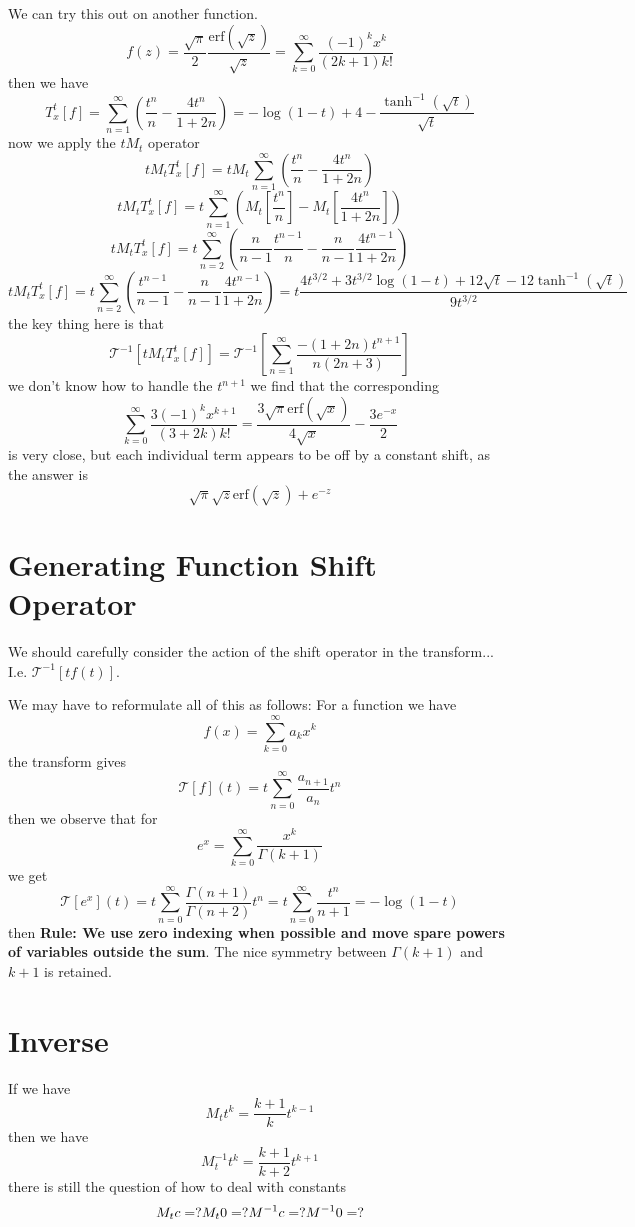 \documentclass{article}
\begin{document}
We can try this out on another function.
$$
f(z) = \frac{\sqrt{\pi}}{2}\frac{\mathrm{erf}(\sqrt{z})}{\sqrt{z}} = \sum_{k=0}^\infty \frac{(-1)^k x^k}{(2k+1)k!}
$$
then we have 
$$
T_x^t[f] = \sum_{n=1}^\infty \left(\frac{t^n}{n} - \frac{4 t^n}{1+2n}\right) = - \log(1-t) + 4 - \frac{\tanh^{-1}(\sqrt{t})}{\sqrt{t}}
$$
now we apply the $t M_t$ operator
$$
t M_t T_x^t[f] = t M_t \sum_{n=1}^\infty \left(\frac{t^n}{n} - \frac{4 t^n}{1+2n}\right)
$$
$$
t M_t T_x^t[f] =  t\sum_{n=1}^\infty \left( M_t[\frac{t^n}{n}] - M_t[\frac{4 t^n}{1+2n}]\right)
$$
$$
t M_t T_x^t[f] =  t \sum_{n=2}^\infty \left( \frac{n}{n-1}\frac{t^{n-1}}{n} - \frac{n}{n-1}\frac{4 t^{n-1}}{1+2n}\right)
$$
$$
t M_t T_x^t[f] =  t \sum_{n=2}^\infty \left( \frac{t^{n-1}}{n-1} - \frac{n}{n-1}\frac{4 t^{n-1}}{1+2n}\right) = t \frac{4 t^{3/2}+3 t^{3/2} \log (1-t)+12 \sqrt{t}-12
    \tanh ^{-1}\left(\sqrt{t}\right)}{9 t^{3/2}}
$$
the key thing here is that
$$
\mathcal{T}^{-1}[t M_t T_x^t[f]] = \mathcal{T}^{-1}[\sum_{n=1}^\infty \frac{-(1+2n)t^{n+1}}{n(2n+3)}]
$$
we don't know how to handle the $t^{n+1}$ we find that the corresponding 
$$
\sum_{k=0}^\infty \frac{3 (-1)^k x^{k+1}}{(3+2k)k!} =   \frac{3 \sqrt{\pi } \text{erf}\left(\sqrt{x}\right)}{4 \sqrt{x}}-\frac{3
    e^{-x}}{2}
$$
is very close, but each individual term appears to be off by a constant shift, as the answer is 
$$
\sqrt{\pi } \sqrt{z} \text{erf}\left(\sqrt{z}\right)+e^{-z}
$$

\section{Generating Function Shift Operator}
We should carefully consider the action of the shift operator in the transform... I.e. $\mathcal{T}^{-1}[t f(t)]$.

We may have to reformulate all of this as follows:
For a function we have 
$$
f(x) = \sum_{k=0}^\infty a_k x^k
$$
the transform gives
$$
\mathcal{T}[f](t) = t \sum_{n=0}^\infty \frac{a_{n+1}}{a_n}t^n
$$
then we observe that for
$$
e^x = \sum_{k=0}^\infty \frac{x^k}{\Gamma(k+1)}
$$
we get
$$
\mathcal{T}[e^x](t) = t \sum_{n=0}^\infty \frac{\Gamma(n+1)}{\Gamma(n+2)} t^n = t \sum_{n=0}^\infty \frac{t^n}{n+1} = -\log(1-t)
$$
then \textbf{Rule: We use zero indexing when possible and move spare powers of variables outside the sum}. The nice symmetry between $\Gamma(k+1)$ and $k+1$ is retained.


\section{Inverse}
If we have 
$$
M_t t^k = \frac{k+1}{k}t^{k-1}
$$
then we have 
$$
M_t^{-1} t^k = \frac{k+1}{k+2}t^{k+1}
$$
there is still the question of how to deal with constants
$$
M_t c =? \\
M_t 0 = ? \\
M^{-1} c = ? \\
M^{-1} 0 = ?
$$


{}

\end{document}
